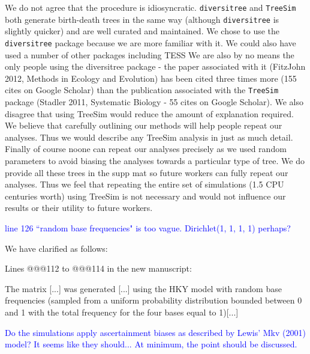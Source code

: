 \documentclass[11pt]{letter}
\begin{document}
\begin{letter}{}
We do not agree that the procedure is idiosyncratic. \texttt{diversitree} and \texttt{TreeSim} both generate birth-death trees in the same way (although \texttt{diversitree} is slightly quicker) and are well curated and maintained. We chose to use the \texttt{diversitree} package because we are more familiar with it. We could also have used a number of other packages including TESS %
We are also by no means the only people using the diversitree package - the paper associated with it (FitzJohn 2012, Methods in Ecology and Evolution) has been cited three times more (155 cites on Google Scholar) than the publication associated with the \texttt{TreeSim} package (Stadler 2011, Systematic Biology - 55 cites on Google Scholar).
We also disagree that using TreeSim would reduce the amount of explanation required. We believe that carefully outlining our methods will help people repeat our analyses. Thus we would describe any TreeSim analysis in just as much detail.
Finally of course noone can repeat our analyses precisely as we used random parameters to avoid biasing the analyses towards a particular type of tree. We do provide all these trees in the supp mat %
so future workers can fully repeat our analyses.
Thus we feel that repeating the entire set of simulations (1.5 CPU centuries worth) using TreeSim is not necessary and would not influence our results or their utility to future workers.


\textcolor{blue}{line 126 ``random base frequencies" is too vague. Dirichlet(1, 1, 1, 1) perhaps?}

We have clarified as follows:

Lines @@@112 to @@@114 in the new manuscript:

\hfill\begin{minipage}{\dimexpr\textwidth-1cm}
The matrix [...] was generated [...] using the HKY model with random base frequencies (sampled from a uniform probability distribution bounded between 0 and 1 with the total frequency for the four bases equal to 1)[...]
\end{minipage}


\textcolor{blue}{Do the simulations apply ascertainment biases as described by Lewis' Mkv (2001) model? It seems like they should... At minimum, the point should be discussed.}




\end{letter}
\end{document}
